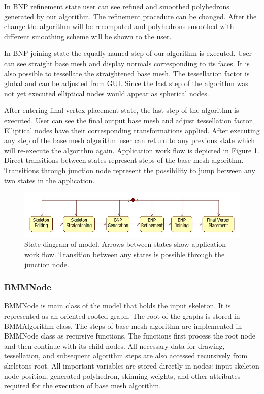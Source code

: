 In BNP refinement state user can see refined and smoothed polyhedrons generated by our algorithm.
The refinement procedure can be changed.
After the change the algorithm will be recomputed and polyhedrons smoothed with different smoothing scheme will be shown to the user.

In BNP joining state the equally named step of our algorithm is executed.
User can see straight base mesh and display normals corresponding to its faces.
It is also possible to tessellate the straightened base mesh.
The tessellation factor is global and can be adjusted from GUI.
Since the last step of the algorithm was not yet executed elliptical nodes would appear as spherical nodes.

After entering final vertex placement state, the last step of the algorithm is executed.
User can see the final output base mesh and adjust tessellation factor.
Elliptical nodes have their corresponding transformations applied.
After executing any step of the base mesh algorithm user can return to any previous state which will re-execute the algorithm again.
Application work flow is depicted in Figure \ref{fig:states}.
Direct transitions between states represent steps of the base mesh algorithm.
Transitions through junction node represent the possibility to jump between any two states in the application.

\begin{figure}[h]
    \centering
    \includegraphics[width=\textwidth]{images/states}
    \caption[Model state diagram]{State diagram of model. Arrows between states show application work flow. Transition between any states is possible through the junction node.}
    \label{fig:states}
\end{figure}

\subsubsection{BMMNode}

BMMNode is main class of the model that holds the input skeleton.
It is represented as an oriented rooted graph.
The root of the graphs is stored in BMMAlgorithm class.
The steps of base mesh algorithm are implemented in BMMNode class as recursive functions.
The functions first process the root node and then continue with its child nodes.
All necessary data for drawing, tessellation, and subsequent algorithm steps are also accessed recursively from skeletons root. All important variables are stored directly in nodes: input skeleton node position, generated polyhedron, skinning weights, and other attributes required for the execution of base mesh algorithm.

